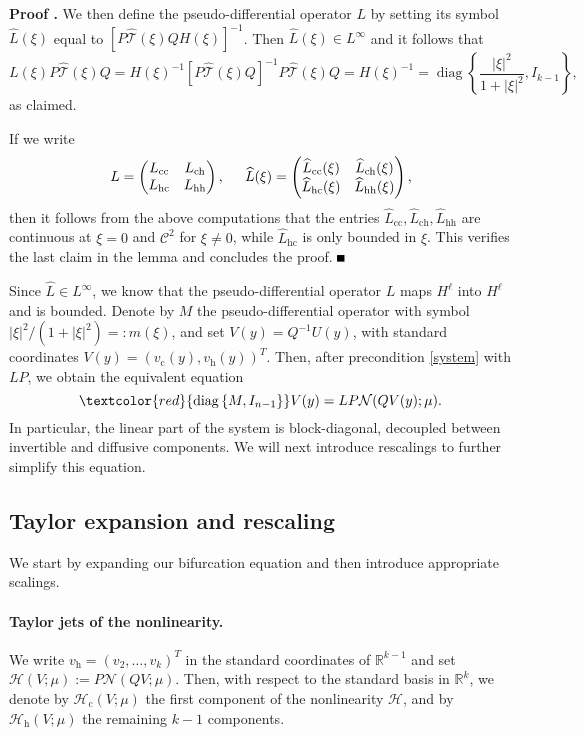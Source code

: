 \documentclass[10pt]{article}
\newenvironment{Proof}[1][\unskip]%
 {\begin{trivlist} \item[]{\bf Proof #1. }}%
 {\hspace*{\fill}$\rule{.4\baselineskip}{.4\baselineskip}$\end{trivlist}}
\newcommand{\R}{\mathbb{R}}
\newcommand{\Nl}{\mathcal{N}}
\newcommand{\That}{\widehat{\mathcal{T}}}
\newcommand{\diag}{\operatorname{diag}}
\begin{document}
\begin{Proof}
 We then define the pseudo-differential operator $L$ by setting its symbol $\widehat{L}(\xi)$ equal to $[P\That(\xi)QH(\xi)]^{-1}$. Then $\widehat{L} (\xi) \in L^\infty$ and it follows that
 \[
 L(\xi)P\That(\xi)Q = H(\xi)^{-1}\left[P\That(\xi)Q\right]^{-1}P\That(\xi)Q = H(\xi)^{-1}=\diag\left\{\dfrac{|\xi|^2}{1+|\xi|^2},I_{k-1}\right\},
 \]
 as claimed.
 
 If we write
\[
L  = \begin{pmatrix}
L_\mathrm{cc} & L_\mathrm{ch} \\
L_\mathrm{hc} & L_\mathrm{hh} 
\end{pmatrix}, \hspace{0.2in}
\widehat{L}(\xi)  = \begin{pmatrix}
\widehat{L}_\mathrm{cc}(\xi) & \widehat{L}_\mathrm{ch}(\xi) \\
\widehat{L}_\mathrm{hc}(\xi) & \widehat{L}_\mathrm{hh}(\xi) 
\end{pmatrix},
\]
then it follows from the above computations that the entries $\widehat{L}_\mathrm{cc}, \widehat{L}_\mathrm{ch},\widehat{L}_\mathrm{hh}$ are continuous at $\xi = 0$ and $\mathscr{C}^2$ for $\xi \neq 0$, while $\widehat{L}_\mathrm{hc}$ is only bounded in $\xi$. This verifies the last claim in the lemma and concludes the proof. 
 \end{Proof}
 
 
 Since $\widehat{L} \in L^\infty$, we know that the pseudo-differential operator $L$ maps $H^\ell$ into $H^\ell$ and is bounded. Denote by $M$ the pseudo-differential operator with symbol $|\xi|^2/(1+|\xi|^2)=: m(\xi)$, and set $V(y)=Q^{-1}U(y)$, with standard coordinates $V(y)=(v_\mathrm{c}(y),v_\mathrm{h}(y))^T$. Then, after precondition \eqref{system} with $LP$, we obtain the equivalent equation
\begin{equation}\label{TranEq}
\textcolor{red}{\diag{\{M, I_{n-1}\}}} V(y)=LP\Nl(QV(y);\mu).
\end{equation}
In particular, the linear part of the system is block-diagonal, decoupled between invertible and diffusive components. We will  next introduce rescalings to further simplify this equation.



\subsection{Taylor expansion and rescaling}\label{s:2.2}
We start by expanding our bifurcation equation and then introduce appropriate scalings. 
\paragraph{Taylor jets of the nonlinearity.} 
We write $v_\mathrm{h} = (v_2,\ldots,v_{k})^T$ in the standard coordinates of $\R^{k-1}$ and set $\mathcal{H}(V;\mu) :=P\Nl(QV;\mu)$. Then, with respect to the standard basis in $\R^k$, we denote by $\mathcal{H}_\mathrm{c}(V;\mu)$ the first component of the nonlinearity $\mathcal{H}$, and by $\mathcal{H}_\mathrm{h}(V;\mu)$ the remaining $k-1$ components. 
\end{document}
